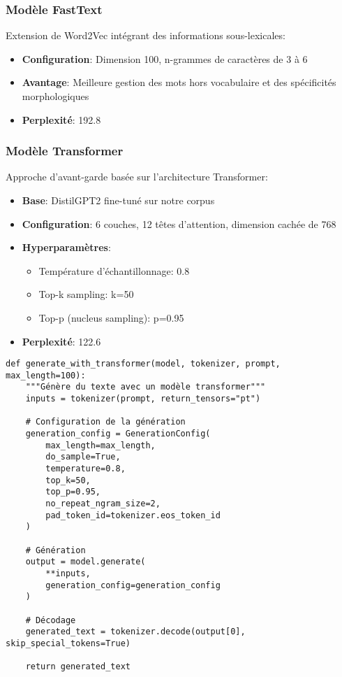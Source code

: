 \documentclass[a4paper,11pt]{article}
\begin{document}
\subsubsection{Modèle FastText}
Extension de Word2Vec intégrant des informations sous-lexicales:
\begin{itemize}
    \item \textbf{Configuration}: Dimension 100, n-grammes de caractères de 3 à 6
    \item \textbf{Avantage}: Meilleure gestion des mots hors vocabulaire et des spécificités morphologiques
    \item \textbf{Perplexité}: 192.8
\end{itemize}

\subsubsection{Modèle Transformer}
Approche d'avant-garde basée sur l'architecture Transformer:
\begin{itemize}
    \item \textbf{Base}: DistilGPT2 fine-tuné sur notre corpus
    \item \textbf{Configuration}: 6 couches, 12 têtes d'attention, dimension cachée de 768
    \item \textbf{Hyperparamètres}: 
    \begin{itemize}
        \item Température d'échantillonnage: 0.8
        \item Top-k sampling: k=50
        \item Top-p (nucleus sampling): p=0.95
    \end{itemize}
    \item \textbf{Perplexité}: 122.6
\end{itemize}

\begin{lstlisting}[caption={Extrait du code de génération avec Transformer}, label=lst:transformer]
def generate_with_transformer(model, tokenizer, prompt, max_length=100):
    """Génère du texte avec un modèle transformer"""
    inputs = tokenizer(prompt, return_tensors="pt")
    
    # Configuration de la génération
    generation_config = GenerationConfig(
        max_length=max_length,
        do_sample=True,
        temperature=0.8,
        top_k=50,
        top_p=0.95,
        no_repeat_ngram_size=2,
        pad_token_id=tokenizer.eos_token_id
    )
    
    # Génération
    output = model.generate(
        **inputs,
        generation_config=generation_config
    )
    
    # Décodage
    generated_text = tokenizer.decode(output[0], skip_special_tokens=True)
    
    return generated_text
\end{lstlisting}
\end{document}
